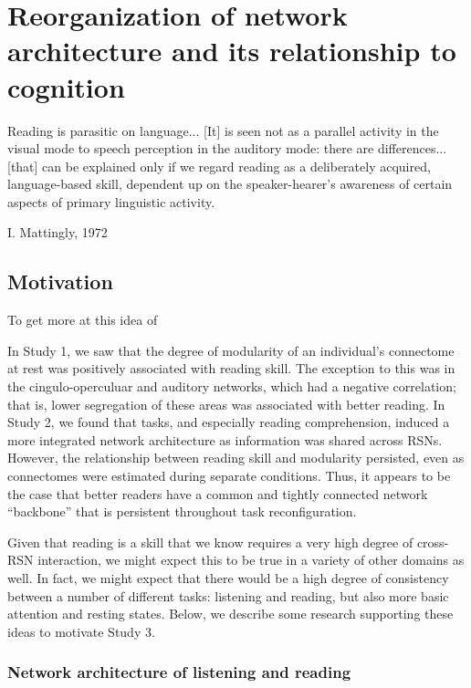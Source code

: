 \chapter{Reorganization of network architecture and its relationship to cognition}

\epigraph{Reading is parasitic on language... [It] is seen not as a parallel activity in the visual mode to speech perception in the auditory mode: there are differences... [that] can be explained only if we regard reading as a deliberately acquired, language-based skill, dependent up on the speaker-hearer's awareness of certain aspects of primary linguistic activity.}{I. Mattingly, 1972 \citep{Mattingly1971}}

\section{Motivation}

To get more at this idea of 

In Study 1, we saw that the degree of modularity of an individual's connectome at rest was positively associated with reading skill. The exception to this was in the cingulo-operculuar and auditory networks, which had a negative correlation; that is, lower segregation of these areas was associated with better reading. In Study 2, we found that tasks, and especially reading comprehension, induced a more integrated network architecture as information was shared across RSNs. However, the relationship between reading skill and modularity persisted, even as connectomes were estimated during separate conditions. Thus, it appears to be the case that better readers have a common and tightly connected network ``backbone'' that is persistent throughout task reconfiguration.

Given that reading is a skill that we know requires a very high degree of cross-RSN interaction, we might expect this to be true in a variety of other domains as well. In fact, we might expect that there would be a high degree of consistency between a number of different tasks: listening and reading, but also more basic attention and resting states. Below, we describe some research supporting these ideas to motivate Study 3.

\subsection{Network architecture of listening and reading}

